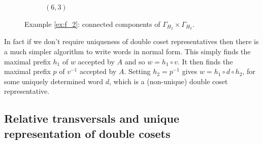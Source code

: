 \documentclass[a4paper,12pt]{article}
\newcommand{\G}{\Gamma }
\numberwithin{equation}{section}
\numberwithin{figure}{section}
\begin{document}
\begin{figure}
\begin{center}
\begin{subfigure}[b]{.13\columnwidth}
\caption{$(6,3)$}
\label{fig:G2xG2-2-6}
\end{subfigure}
\end{center}
\caption{Example \ref{ex:f_2}: connected components of $\G_{H_2}\times \G_{H_2}$.}\label{fig:G2xG2-2}
\end{figure}

In fact if we don't require uniqueness of double coset representatives then
there is a much simpler algorithm to write words in normal form.
This simply finds the maximal prefix $h_1$ of $w$  accepted  by
$A$  and so $w=h_1\circ v$. It then finds the maximal prefix $p$
of $v^{-1}$ accepted by $A$. Setting $h_2=p^{-1}$ gives
$w=h_1\circ d \circ h_2$, for some uniquely determined word $d$,
which is a (non-unique) double coset representative.
%
%
\subsection{Relative transversals and unique representation of 
double cosets}\label{sub:reltran}
\end{document}
